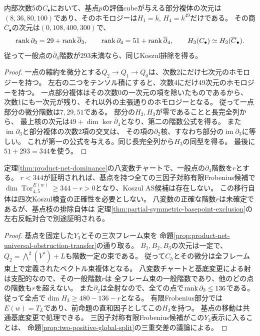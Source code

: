 \begin{lemma}[一点評価部分を除いた小複体]\label{lem:one-return-point-quotient}
内部次数5の$C_\bullet$において、基点$p$の評価cubeが与える部分複体の次元は
$(8,36,80,100)$であり、そのホモロジーは$H_1=k$, $H_4=k^{49}$だけである。
その商$\overline C_\bullet$の次元は$(0,108,400,300)$で、
\[
 \operatorname{rank}\partial_3=29+\operatorname{rank}\overline\partial_3,\qquad
 \operatorname{rank}\partial_4=51+\operatorname{rank}\overline\partial_4,\qquad
 H_3(C_\bullet)\simeq H_3(\overline C_\bullet).
\]
従って一般点の$\overline\partial_4$階数が293未満なら、同じKoszul排除を得る。
\end{lemma}
\begin{proof}
一点の縮約を微分とする$Q_2\to Q_1\to Q_0$は、次数2にだけ七次元のホモロジーを持つ。
左右の二つをテンソル積にすると、次数4にだけ49次元のホモロジーを持つ。
一点部分複体はその次数0の一次元の項を除いたものであるから、
次数1にも一次元が残り、それ以外の主張通りのホモロジーとなる。
従って一点部分の微分階数は$7,29,51$である。
部分の$H_2,H_3$が零であることと長完全列から、
最上核の次元は$49+\dim\ker\overline\partial_4$となり、第二の階数公式を得る。
また$\operatorname{im}\partial_3$と部分複体の次数2項の交叉は、
その項の$\partial_2$核、すなわち部分の$\operatorname{im}\partial_3$に等しい。
これが第一の公式を与える。同じ長完全列から$H_3$の同型を得る。
最後に$51+293=344$を使う。
\end{proof}

\begin{proposition}[一般点の一回Torから基点枝全体への移行]
\label{prop:one-return-universal-transfer}
定理\ref{thm:product-net-dominance}の八変数チャートで、一般点の$\partial_4$階数を$r$とする。
$r<344$が証明されれば、基点を持つ全ての三因子対称有限Frobenius候補で
$\dim\operatorname{Tor}^{E(w)}_{4,5}\geq344-r>0$となり、Koszul AS候補は存在しない。
この移行自体は四次Koszul検査の正確性を必要としない。
八変数の正確な階数$r$は未確定であるが、基点枝の排除自体は
定理\ref{thm:partial-symmetric-basepoint-exclusion}の左右反転対合で別途証明される。
\end{proposition}
\begin{proof}
基点を固定した$Y_3$とその三次フレーム束を
命題\ref{prop:product-net-universal-obstruction-transfer}の通り取る。
$B_1,B_2,B_3$の次元は一定で、$Q_2=\bigwedge^2(V^*)+L$も階数一定の束である。
従って$C_h$とその微分は全フレーム束上で定義されたベクトル束複体となる。
八変数チャートと基底変更による射は支配的なので、その一般階数$r$は
全フレーム束の一般階数であり、他のどの点の階数も$r$を超えない。
また$\partial_2$は全射なので、全ての点で$\operatorname{rank}\partial_3\leq136$である。
従って全点で$\dim H_3\geq480-136-r$となる。
有限Frobenius部分では$E(w)=T_L$であり、前命題の直和因子としてこの$H_3$を持つ。
基点の移動は共通基底変更で処理できる。
三因子対称有限Frobenius候補がこの$Y_3$表示に入ることは、
命題\ref{prop:two-positive-global-split}の三重交差の議論による。
\end{proof}

